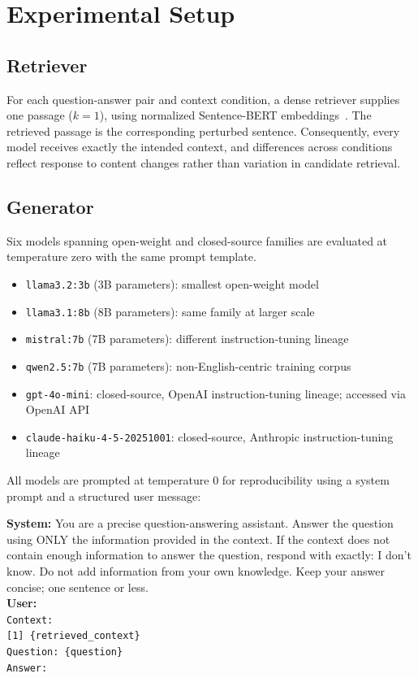 \documentclass[11pt]{article}
\begin{document}
\section{Experimental Setup}
\label{sec:pipeline}

\subsection{Retriever}

For each question-answer pair and context condition, a dense retriever supplies one
passage ($k=1$), using normalized Sentence-BERT embeddings~\cite{reimers2019sentencebert}.
The retrieved passage is the corresponding perturbed sentence. Consequently, every model
receives exactly the intended context, and differences across conditions reflect response
to content changes rather than variation in candidate retrieval.

\subsection{Generator}

Six models spanning open-weight and closed-source families are evaluated at temperature
zero with the same prompt template.

\begin{itemize}[noitemsep]
  \item \texttt{llama3.2:3b} (3B parameters): smallest open-weight model
  \item \texttt{llama3.1:8b} (8B parameters): same family at larger scale
  \item \texttt{mistral:7b}  (7B parameters): different instruction-tuning lineage
  \item \texttt{qwen2.5:7b}  (7B parameters): non-English-centric training corpus
  \item \texttt{gpt-4o-mini}: closed-source, OpenAI instruction-tuning lineage; accessed via OpenAI API
  \item \texttt{claude-haiku-4-5-20251001}: closed-source, Anthropic instruction-tuning lineage
\end{itemize}

All models are prompted at temperature 0 for reproducibility using a system prompt and
a structured user message:

\begin{examplebox}
\small
\textbf{System:} You are a precise question-answering assistant. Answer the question
using ONLY the information provided in the context. If the context does not contain
enough information to answer the question, respond with exactly: I don't know. Do not
add information from your own knowledge. Keep your answer concise; one sentence or
less.\\[6pt]
\textbf{User:}\\
\texttt{Context:}\\
\texttt{[1] \{retrieved\_context\}}\\[4pt]
\texttt{Question: \{question\}}\\[4pt]
\texttt{Answer:}
\end{examplebox}
\end{document}
